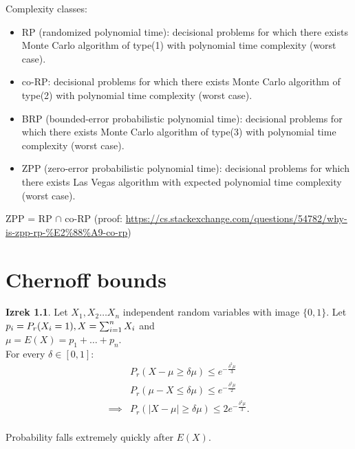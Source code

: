 \documentclass[a4paper, 12pt]{book}
\theoremstyle{definition}
\newtheorem{theorem}[counter]{Izrek}
\theoremstyle{remark}
\begin{document}
Complexity classes:
\begin{itemize}
  \item RP (randomized polynomial time): decisional problems for which there exists Monte Carlo algorithm of type(1)
    with polynomial time complexity (worst case).
  \item co-RP: decisional problems for which there exists Monte Carlo algorithm of type(2) with polynomial time complexity
    (worst case).
  \item BRP (bounded-error probabilistic polynomial time): decisional problems for which there exists Monte Carlo algorithm of type(3)
    with polynomial time complexity (worst case).
  \item ZPP (zero-error probabilistic polynomial time): decisional problems for which there exists Las Vegas algorithm
    with expected polynomial time complexity (worst case).
\end{itemize}
ZPP = RP $\cap$ co-RP (proof: \url{https://cs.stackexchange.com/questions/54782/why-is-zpp-rp-%E2%88%A9-co-rp})



\chapter{Chernoff bounds}


\begin{theorem}
  Let $X_1, X_2 \dots X_n$ independent random variables with image $\{0, 1\}$. Let \\
  $p_i = P_r(X_i = 1), \\
  X = \sum_{i=1}^{n} X_i$ and \\
  $\mu = E(X) = p_1 + \dots + p_n$. \\
  For every $\delta \in [0,1]$:
  \begin{align*}
    &P_r(X - \mu \geq \delta \mu) \leq e^{-\frac{\delta^2 \mu}{3}} \\
    &P_r(\mu - X \leq \delta \mu) \leq e^{-\frac{\delta^2 \mu}{2}} \\
    \implies &P_r(|X - \mu| \geq \delta \mu) \leq 2e^{-\frac{\delta^2 \mu}{3}}. \\
  \end{align*}
\end{theorem}
Probability falls extremely quickly after $E(X)$.


\end{document}
